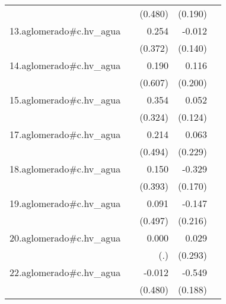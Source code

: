 {\begin{longtable}{l*{4}{D{.}{.}{-1}}}
            &                     &     (0.480)         &     (0.190)         &                     \\
\addlinespace
13.aglomerado#c.hv\_agua&                     &       0.254         &      -0.012         &                     \\
            &                     &     (0.372)         &     (0.140)         &                     \\
\addlinespace
14.aglomerado#c.hv\_agua&                     &       0.190         &       0.116         &                     \\
            &                     &     (0.607)         &     (0.200)         &                     \\
\addlinespace
15.aglomerado#c.hv\_agua&                     &       0.354         &       0.052         &                     \\
            &                     &     (0.324)         &     (0.124)         &                     \\
\addlinespace
17.aglomerado#c.hv\_agua&                     &       0.214         &       0.063         &                     \\
            &                     &     (0.494)         &     (0.229)         &                     \\
\addlinespace
18.aglomerado#c.hv\_agua&                     &       0.150         &      -0.329         &                     \\
            &                     &     (0.393)         &     (0.170)         &                     \\
\addlinespace
19.aglomerado#c.hv\_agua&                     &       0.091         &      -0.147         &                     \\
            &                     &     (0.497)         &     (0.216)         &                     \\
\addlinespace
20.aglomerado#c.hv\_agua&                     &       0.000         &       0.029         &                     \\
            &                     &         (.)         &     (0.293)         &                     \\
\addlinespace
22.aglomerado#c.hv\_agua&                     &      -0.012         &      -0.549\sym{**} &                     \\
            &                     &     (0.480)         &     (0.188)         &                     \\

\end{longtable}}
